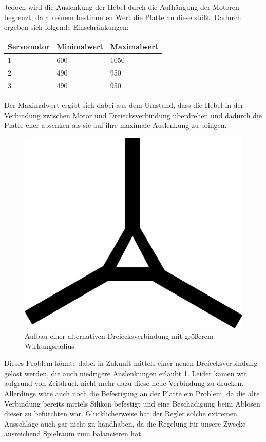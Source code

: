 \documentclass[12pt,a4paper,bibliography=totoc,listof=totoc]{scrartcl}
\begin{document}
Jedoch wird die Auslenkung der Hebel durch die Aufhängung der Motoren begrenzt, da ab einem 
bestimmten Wert die Platte an diese stößt. Dadurch ergeben sich folgende Einschränkungen:
\newline
\begin{tabularx}{8cm}{|l|l|l|}
\hline
 Servomotor		& Minimalwert & Maximalwert \\
\hline
 1				& 600		&  1050 \\
\hline
 2				& 490		& 950\\
\hline
 3				& 490		& 950\\
\hline
\end{tabularx}
\newline
Der Maximalwert ergibt sich dabei aus dem Umstand, dass die Hebel in der Verbindung zwischen Motor und 
Dreiecksverbindung überdrehen und dadurch die Platte eher absenken als sie auf ihre maximale Auslenkung zu 
bringen. 
 \begin{figure}[htbp]
	\centering
	\includegraphics[scale = 0.8]{pics/neuedreiecksverbindung}
	\caption{Aufbau einer alternativen Dreiecksverbindung mit größerem Wirkungsradius}
	\label{dreieckneu}
\end{figure}
Dieses Problem könnte dabei in Zukunft mittels einer neuen Dreiecksverbindung gelöst werden, die auch niedrigere 
Auslenkungen erlaubt \ref {dreieckneu}. Leider kamen wir aufgrund von Zeitdruck nicht mehr dazu diese neue Verbindung zu drucken. 
Allerdings wäre auch noch die Befestigung an der Platte ein Problem, da die alte Verbindung bereits mittels Silikon befestigt und 
eine Beschädigung beim Ablösen dieser zu befürchten war. Glücklicherweise hat der Regler solche extremen Ausschläge auch gar nicht zu 
handhaben, da die Regelung für unsere Zwecke ausreichend Spielraum zum balancieren hat.
\end{document}
